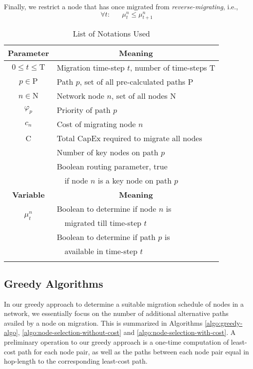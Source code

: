 \documentclass[conference]{IEEEtran}
\begin{document}
Finally, we restrict a node that has once migrated from \emph{reverse-migrating}, i.e.,
\[
\forall t: \,\,\,\,\,\,\,\,\,\,
\mu^n_t \leq \mu^n_{t+1}
\]

\begin{table}[tb]\begin{center}\caption{List of Notations Used}\label{table:symbols}
\begin{tabular}{ c l }
\toprule
\textbf{Parameter} & \multicolumn{1}{c}{\textbf{Meaning}} \\
\midrule
$0\leq t\leq\text{T}$ & Migration time-step $t$, number of time-steps T
\\\addlinespace[1.0mm] $p\in\text{P}$ & Path $p$, set of all pre-calculated paths P \\\addlinespace[1.0mm]
$n\in\text{N}$ & Network node $n$, set of all nodes N \\\addlinespace[1.0mm]
$\varphi_p$ & Priority of path $p$ \\\addlinespace[1.0mm]
$c_n$ & Cost of migrating node $n$ \\\addlinespace[1.0mm]
C & Total CapEx required to migrate all nodes \\\addlinespace[1.0mm]
{$\alpha_p$} & Number of key nodes on path $p$ \\\addlinespace[1.0mm]
\multirow{2}{*}{$\beta^n_p$} & Boolean routing parameter, true \\
 & $\text{ }$ if node $n$ is a key node on path $p$ \\\addlinespace[1.0mm]
\midrule
\textbf{Variable} & \multicolumn{1}{c}{\textbf{Meaning}} \\
\midrule
\multirow{2}{*}{$\mu^n_t$} & Boolean to determine if node $n$ is \\
 & $\text{ }$ migrated till time-step $t$ \\\addlinespace[1.0mm]
\multirow{2}{*}{$\pi^p_t$} & Boolean to determine if path $p$ is \\
 & $\text{ }$ available in time-step $t$ \\\addlinespace[1.0mm]
\bottomrule
\end{tabular}
\vspace{-5mm}
\end{center}\end{table}

\subsection{Greedy Algorithms} \label{sec:greedy-algo}
In our greedy approach to determine a suitable migration schedule of nodes in a
network, we essentially focus on the number of additional alternative paths
availed by a node on migration. This is summarized in Algorithms
\ref{algo:greedy-algo},
\ref{algo:node-selection-without-cost} and \ref{algo:node-selection-with-cost}.
A preliminary operation to our greedy approach is a one-time computation of 
least-cost path for each node pair, as well as the paths between each node
pair equal in hop-length to the corresponding least-cost path.
\end{document}
